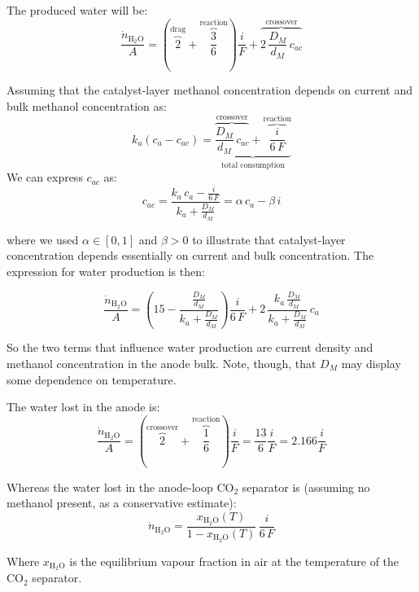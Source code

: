 \documentclass[a4paper,10pt]{article}
\newcommand{\HHO}{\ensuremath{\mathrm{H_2O}}}
\newcommand{\COO}{\ensuremath{\mathrm{CO_2}}}
\begin{document}
The produced water will be:
\begin{equation}
\frac{\dot n_\HHO}{A} = \left( \overbrace{2}^\text{drag} +
\overbrace{\frac{3}{6}}^\text{reaction} \right) \frac{i}{F} +
\overbrace{2\,\frac{D_M}{d_M}\,c_{ac}}^\text{crossover}
\end{equation}

Assuming that the catalyst-layer methanol concentration depends on current and
bulk methanol concentration as:
\begin{equation}
k_a(c_a-c_{ac}) = \underbrace{
\overbrace{\frac{D_M}{d_M}\,c_{ac}}^\text{crossover} +
\overbrace{\frac{i}{6\,F}}^\text{reaction}
}_\text{total consumption}
\end{equation}
We can express $c_{ac}$ as:
\begin{equation}
c_{ac} = \frac{k_a\,c_a - \frac{i}{6\,F}}{k_a+\frac{D_M}{d_M}}
= \alpha \, c_a - \beta \,i
\end{equation}

where we used $\alpha \in [0,1]$ and $\beta>0$ to illustrate that catalyst-layer
concentration depends essentially on current and bulk concentration.
The expression for water production is then:

\begin{equation}
\boxed{
\frac{\dot n_\HHO}{A} = \left(15 - \frac{\frac{D_M}{d_M}}{k_a+\frac{D_M}{d_M}}
\right) \frac{i}{6\,F} +
2\,\frac{k_a\,\frac{D_M}{d_M}}{k_a+\frac{D_M}{d_M}} \, c_a
}
\end{equation}

So the two terms that influence water production are current density and
methanol concentration in the anode bulk. Note, though, that $D_M$ may display
some dependence on temperature.

The water lost in the anode is:
\begin{equation}
\frac{\dot n_\HHO}{A} = \left( \overbrace{2}^\text{crossover} +
\overbrace{\frac{1}{6}}^\text{reaction} \right) \frac{i}{F}=
\frac{13}{6}\frac{i}{F} = 2.166 \frac{i}{F}
\end{equation}

Whereas the water lost in the anode-loop \COO{} separator is (assuming no
methanol present, as a conservative estimate):
\begin{equation}
\dot n_\HHO = \frac{x_\HHO(T)}{1-x_\HHO(T)}\,\frac{i}{6\,F}
\end{equation}

Where $x_\HHO$ is the equilibrium vapour fraction in air at the temperature
of the \COO{} separator.
\end{document}
